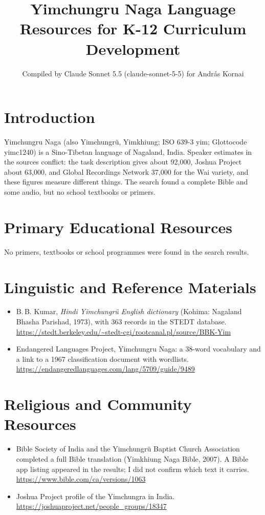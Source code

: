 \documentclass[12pt]{article}
\title{Yimchungru Naga Language Resources for K-12 Curriculum Development}
\author{Compiled by Claude Sonnet 5.5 (claude-sonnet-5-5) for Andr\'as Kornai}
\date{}
\begin{document}
\maketitle

\section{Introduction}
Yimchungru Naga (also Yimchungrü, Yimkhiung; ISO 639-3 yim; Glottocode yimc1240) is a Sino-Tibetan language of Nagaland, India. Speaker estimates in the sources conflict: the task description gives about 92,000, Joshua Project about 63,000, and Global Recordings Network 37,000 for the Wai variety, and these figures measure different things. The search found a complete Bible and some audio, but no school textbooks or primers.

\section{Primary Educational Resources}
No primers, textbooks or school programmes were found in the search results.

\section{Linguistic and Reference Materials}
\begin{itemize}
\item B.\,B. Kumar, \emph{Hindi Yimchungr\"u English dictionary} (Kohima: Nagaland Bhasha Parishad, 1973), with 363 records in the STEDT database. \url{https://stedt.berkeley.edu/~stedt-cgi/rootcanal.pl/source/BBK-Yim}
\item Endangered Languages Project, Yimchungru Naga: a 38-word vocabulary and a link to a 1967 classification document with wordlists. \url{https://endangeredlanguages.com/lang/5709/guide/9489}
\end{itemize}

\section{Religious and Community Resources}
\begin{itemize}
\item Bible Society of India and the Yimchungr\"u Baptist Church Association completed a full Bible translation (Yimkhiung Naga Bible, 2007). A Bible app listing appeared in the results; I did not confirm which text it carries. \url{https://www.bible.com/ca/versions/1063}
\item Joshua Project profile of the Yimchungra in India. \url{https://joshuaproject.net/people_groups/18347}
\end{itemize}
\end{document}
